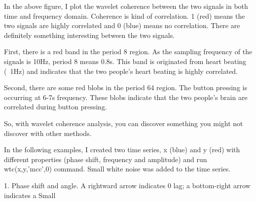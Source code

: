 \documentclass{biophys-new}
\begin{document}
In the above figure, I plot the wavelet coherence between the two signals in both time and frequency domain. Coherence is kind of correlation. 1 (red) means the two signals are highly correlated and 0 (blue) means no correlation. There are definitely something interesting between the two signals.

First, there is a red band in the period 8 region. As the sampling frequency of the signals is 10Hz, period 8 means 0.8s. This band is originated from heart beating (~1Hz) and indicates that the two people’s heart beating is highly correlated.

Second, there are some red blobs in the period 64 region. The button pressing is occurring at 6-7s frequency. These blobs indicate that the two people’s brain are correlated during button pressing.

So, with wavelet coherence analysis, you can discover something you might not discover with other methods.

In the following examples, I created two time series, x (blue) and y (red) with different properties (phase shift, frequency and amplitude) and run wtc(x,y,’mcc’,0) command. Small white noise was added to the time series.

1. Phase shift and angle.
A rightward arrow indicates 0 lag; a bottom-right arrow indicates a Small
\end{document}
